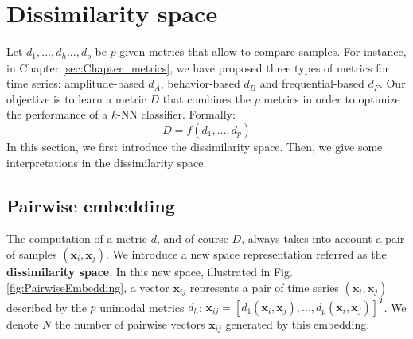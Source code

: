 \section{Dissimilarity space}
Let  $d_1, ..., d_h ..., d_p$ be $p$ given metrics that allow to compare samples. For instance, in Chapter \ref{sec:Chapter_metrics}, we have proposed three types of metrics for time series: amplitude-based $d_A$, behavior-based $d_B$ and frequential-based $d_F$. Our objective is to learn a metric $D$ that combines the $p$ metrics in order to optimize the performance of a $k$-NN classifier. Formally:
\begin{equation}
	D = f(d_1, \ldots , d_p)
\end{equation}
In this section, we first introduce the dissimilarity space. Then, we give some interpretations in the dissimilarity space. 


\subsection{Pairwise embedding}
\label{sec:Pairwise_embedding}
The computation of a metric $d$, and of course $D$, always takes into account a pair of samples $(\textbf{x}_i,\textbf{x}_j)$. We introduce a new space representation referred as the \textbf{dissimilarity space}. In this new space, illustrated in Fig. \ref{fig:PairwiseEmbedding}, a vector $\textbf{x}_{ij}$ represents a pair of time series $(\textbf{x}_i,\textbf{x}_j)$ described by the $p$ unimodal metrics $d_h$: $\textbf{x}_{ij}=[d_1(\textbf{x}_i,\textbf{x}_j), ..., d_p(\textbf{x}_i,\textbf{x}_j)]^T$. We denote $N$ the number of pairwise vectors $\textbf{x}_{ij}$ generated by this embedding.


